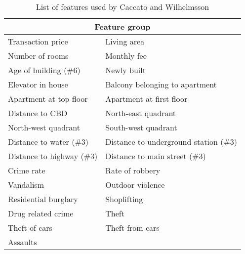 \begin{table}[H]
\begin{tabular}{ | l || l | } 
\hline 
\multicolumn{2}{|c|}{Feature group} \\
\hline
\hline
Transaction price & Living area \\
Number of rooms & Monthly fee \\
Age of building (\#6) & Newly built \\
Elevator in house & Balcony belonging to apartment \\
Apartment at top floor & Apartment at first floor \\
\hline
Distance to CBD & North-east quadrant \\
North-west quadrant & South-west quadrant \\
\hline
Distance to water (\#3) & Distance to underground station (\#3) \\
Distance to highway (\#3) & Distance to main street (\#3) \\
\hline
Crime rate & Rate of robbery \\
Vandalism & Outdoor violence \\
Residential burglary & Shoplifting \\
Drug related crime & Theft \\
Theft of cars & Theft from cars \\
Assaults & \\
\hline
\end{tabular}
\caption{List of features used by Caccato and Wilhelmsson}
\label{tab:feature_list_CeccWilh_11}
\end{table}



